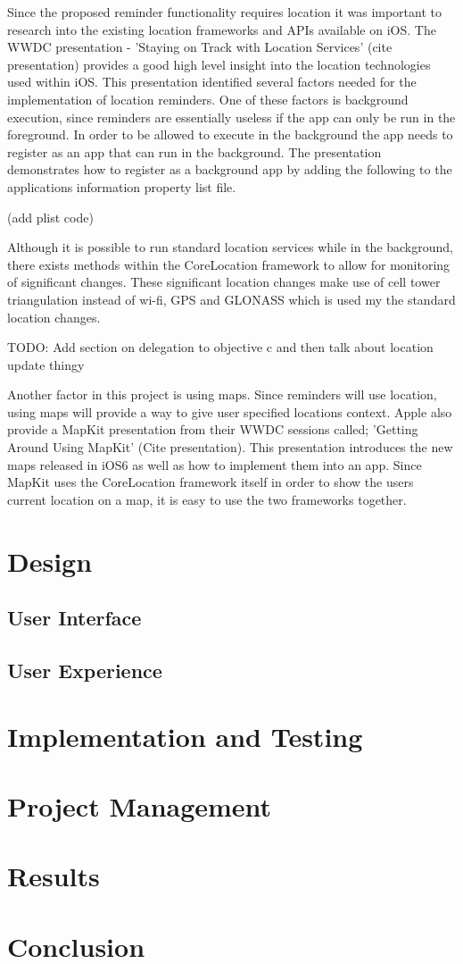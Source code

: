 \documentclass[12pt]{report}
\begin{document}
Since the proposed reminder functionality requires location it was important to research into the existing location frameworks and APIs available on iOS. The WWDC presentation - 'Staying on Track with Location Services' (cite presentation) provides a good high level insight into the location technologies used within iOS. This presentation identified several factors needed for the implementation of location reminders. One of these factors is background execution, since reminders are essentially useless if the app can only be run in the foreground. In order to be allowed to execute in the background the app needs to register as an app that can run in the background. The presentation demonstrates how to register as a background app by adding the following to the applications information property list file.

(add plist code)

Although it is possible to run standard location services while in the background, there exists methods within the CoreLocation framework to allow for monitoring of significant changes. These significant location changes make use of cell tower triangulation instead of wi-fi, GPS and GLONASS which is used my the standard location changes.

TODO: Add section on delegation to objective c and then talk about location update thingy

Another factor in this project is using maps. Since reminders will use location, using maps will provide a way to give user specified locations context. Apple also provide a MapKit presentation from their WWDC sessions called; 'Getting Around Using MapKit' (Cite presentation). This presentation introduces the new maps released in iOS6 as well as how to implement them into an app. Since MapKit uses the CoreLocation framework itself in order to show the users current location on a map, it is easy  to use the two frameworks together.

\section{Design}

\subsection{User Interface}

\subsection{User Experience}

\section{Implementation and Testing}

\section{Project Management}

\section{Results}

\section{Conclusion}

\newpage

 

\end{document}

